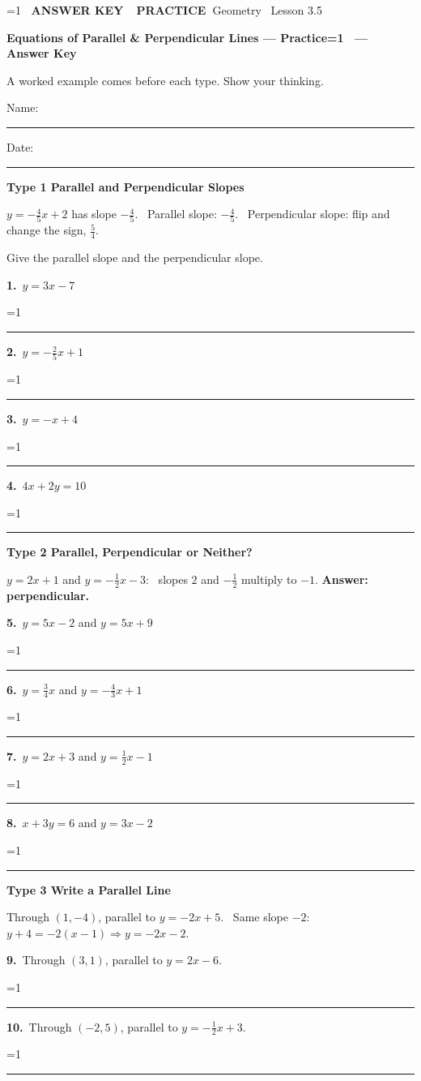 \documentclass[11pt,letterpaper]{article}
\newcommand{\badge}[1]{\colorbox{fmtitle}{\color{white}\bfseries\small\ #1\ }}
\newcommand{\topicbar}[1]{\needspace{4.5cm}\par\vspace{5mm}
  \begin{tcolorbox}[enhanced,colback=fmtitle,colframe=fmtitle,arc=2mm,left=4mm,top=1.5mm,bottom=1.5mm]
  \color{white}\bfseries\large #1
  \end{tcolorbox}}
\providecommand{\iskey}{0}
\newcommand{\pans}[2][3.2cm]{\ifnum\iskey=1 \underline{\makebox[#1][c]{\color{fmmistake}\bfseries #2}}\else\rule{#1}{0.4pt}\fi}
\newcommand{\sdp}[3]{\begin{minipage}[t][2.4cm]{0.48\linewidth}{\color{fmturn}\bfseries #1.}\ #2\par\vfill\hfill \pans[3.6cm]{#3}\end{minipage}}
\newcommand{\algp}[3]{\begin{minipage}[t][4.6cm]{0.48\linewidth}{\color{fmturn}\bfseries #1.}\ #2\par\vfill\hfill \pans[4.2cm]{#3}\end{minipage}}
\newlength{\pw}
\renewcommand{\pans}[2][3.2cm]{\ifnum\iskey=1 \settowidth{\pw}{\bfseries #2}\ifdim\pw>#1 \parbox[b]{#1}{\raggedleft\color{fmmistake}\bfseries\small #2}\else\underline{\makebox[#1][c]{\color{fmmistake}\bfseries #2}}\fi\else\rule{#1}{0.4pt}\fi}
\begin{document}
\ifnum\iskey=1 \colorbox{fmwatch}{\color{white}\bfseries\small\ ANSWER KEY\ }\else\badge{PRACTICE}\fi\hfill{\small\color{fmgray}Geometry \textperiodcentered\ Lesson 3.5}\par\vspace{4mm}
{\color{fmtitle}\LARGE\bfseries Equations of Parallel \& Perpendicular Lines --- Practice\ifnum\iskey=1 \ --- Answer Key\fi}\par\vspace{1mm}
{\color{fmgray}A worked example comes before each type. Show your thinking.}\par\vspace{3mm}
Name: \rule{6cm}{0.4pt}\hspace{1cm}Date: \rule{3.5cm}{0.4pt}\par\vspace{2mm}


\needspace{6cm}\topicbar{Type 1 \quad Parallel and Perpendicular Slopes}
\begin{watchme}$y = -\tfrac45 x + 2$ has slope $-\tfrac45$. \ Parallel slope: $-\tfrac45$. \ Perpendicular slope: flip and change the sign, $\tfrac54$.\end{watchme}
Give the parallel slope and the perpendicular slope.\par
\needspace{3.4cm}\noindent\sdp{1}{$y = 3x - 7$}{$3$; \ $-\tfrac13$}\hfill\sdp{2}{$y = -\tfrac25 x + 1$}{$-\tfrac25$; \ $\tfrac52$}\par\vspace{2mm}
\needspace{3.4cm}\noindent\sdp{3}{$y = -x + 4$}{$-1$; \ $1$}\hfill\sdp{4}{$4x + 2y = 10$}{$-2$; \ $\tfrac12$}\par

\needspace{6cm}\topicbar{Type 2 \quad Parallel, Perpendicular or Neither?}
\begin{watchme}$y = 2x + 1$ and $y = -\tfrac12 x - 3$: \ slopes $2$ and $-\tfrac12$ multiply to $-1$. \quad \textbf{Answer: perpendicular.}\end{watchme}
\needspace{3.4cm}\noindent\sdp{5}{$y = 5x - 2$ and $y = 5x + 9$}{parallel}\hfill\sdp{6}{$y = \tfrac34 x$ and $y = -\tfrac43 x + 1$}{perpendicular}\par\vspace{2mm}
\needspace{3.4cm}\noindent\sdp{7}{$y = 2x + 3$ and $y = \tfrac12 x - 1$}{neither}\hfill\sdp{8}{$x + 3y = 6$ and $y = 3x - 2$}{perpendicular}\par

\needspace{6cm}\topicbar{Type 3 \quad Write a Parallel Line}
\begin{watchme}Through $(1, -4)$, parallel to $y = -2x + 5$. \ Same slope $-2$: $y + 4 = -2(x - 1) \Rightarrow y = -2x - 2$.\end{watchme}
\needspace{4.6cm}\noindent\algp{9}{Through $(3, 1)$, parallel to $y = 2x - 6$.}{$y = 2x - 5$}\hfill\algp{10}{Through $(-2, 5)$, parallel to $y = -\tfrac12 x + 3$.}{$y = -\tfrac12 x + 4$}\par
\end{document}
